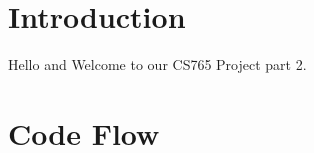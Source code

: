 \documentclass[a4paper,14pt]{article}
\begin{document}

\date{Spring 2023}
\maketitle

\justifying


\justifying

\section*{Introduction}

Hello and Welcome to our CS765 Project part 2.

\section{Code Flow}
\end{document}
